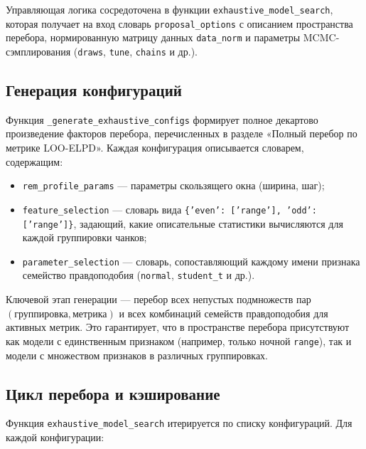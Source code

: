\documentclass[14pt]{mmcs_article}
\begin{document}
Управляющая логика сосредоточена в функции \linebreak
\texttt{exhaustive\_model\_search}, которая получает на вход
словарь \linebreak \texttt{proposal\_options} с описанием пространства
перебора, нормированную матрицу данных
\texttt{data\_norm} и параметры MCMC-сэмплирования
(\texttt{draws}, \texttt{tune}, \texttt{chains} и др.).

\subsection*{Генерация конфигураций}

Функция \texttt{\_generate\_exhaustive\_configs} формирует
полное декартово произведение факторов перебора, перечисленных
в разделе «Полный перебор по метрике LOO-ELPD».
Каждая конфигурация описывается словарем, содержащим:

\begin{itemize}
	\item \texttt{rem\_profile\_params} — параметры
	скользящего окна (ширина, шаг);
	\item \texttt{feature\_selection} — словарь вида\linebreak
	\texttt{\{'even': ['range'], 'odd': ['range']\}},
	задающий, какие описательные статистики вычисляются
	для каждой группировки чанков;
	\item \texttt{parameter\_selection} — словарь, сопоставляющий
	каждому имени признака семейство правдоподобия
	(\texttt{normal}, \texttt{student\_t} и др.).
\end{itemize}

Ключевой этап генерации — перебор всех непустых подмножеств
пар $(\text{группировка}, \text{метрика})$ и всех комбинаций
семейств правдоподобия для активных метрик. Это гарантирует,
что в пространстве перебора присутствуют как модели с
единственным признаком (например, только ночной \texttt{range}),
так и модели с множеством признаков в
различных группировках.

\subsection*{Цикл перебора и кэширование}

Функция \texttt{exhaustive\_model\_search} итерируется по
списку конфигураций. Для каждой конфигурации:
\end{document}
